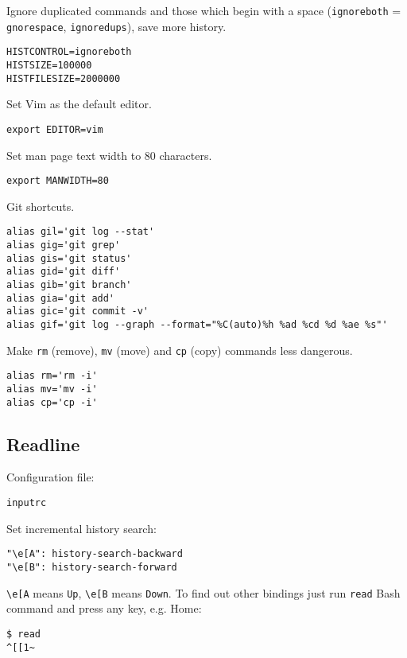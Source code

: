 \documentclass{article}
\begin{document}
Ignore duplicated commands and those which begin with a space (\verb"ignoreboth"
= \verb"gnorespace", \verb"ignoredups"), save more history.

\begin{verbatim}
HISTCONTROL=ignoreboth
HISTSIZE=100000
HISTFILESIZE=2000000
\end{verbatim}

Set Vim as the default editor.

\begin{verbatim}
export EDITOR=vim
\end{verbatim}

Set man page text width to 80 characters.

\begin{verbatim}
export MANWIDTH=80
\end{verbatim}

Git shortcuts.

\begin{verbatim}
alias gil='git log --stat'
alias gig='git grep'
alias gis='git status'
alias gid='git diff'
alias gib='git branch'
alias gia='git add'
alias gic='git commit -v'
alias gif='git log --graph --format="%C(auto)%h %ad %cd %d %ae %s"'
\end{verbatim}

Make \texttt{rm} (remove), \texttt{mv} (move) and \texttt{cp} (copy) commands less dangerous.

\begin{verbatim}
alias rm='rm -i'
alias mv='mv -i'
alias cp='cp -i'
\end{verbatim}

\subsection{Readline}

Configuration file:

\begin{verbatim}
inputrc
\end{verbatim}

Set incremental history search:
\begin{verbatim}
"\e[A": history-search-backward
"\e[B": history-search-forward
\end{verbatim}

\verb"\e[A" means \verb"Up", \verb"\e[B" means \verb"Down".  To find out other 
bindings just run \verb"read" Bash command and press any key, e.g. Home:
\begin{verbatim}
$ read
^[[1~
\end{verbatim}
\end{document}
